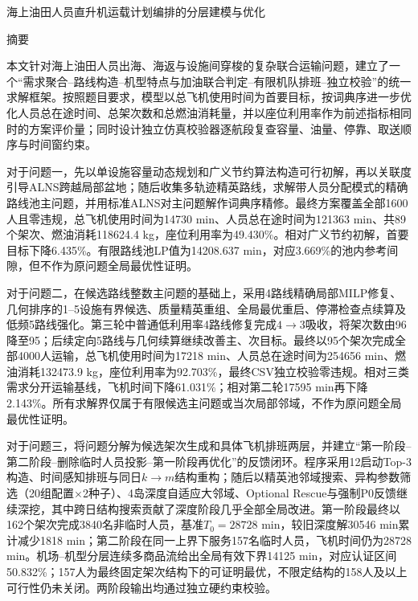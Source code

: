 \documentclass[UTF8,a4paper,zihao=5]{ctexart}
\newcommand{\papertitle}{海上油田人员直升机运载计划编排的分层建模与优化}
\begin{document}
\setcounter{page}{1}

\thispagestyle{plain}
\begin{center}
  {\heiti{}\papertitle\par}
  \vspace{1.2em}
  {\heiti{}摘\quad 要}
\end{center}

本文针对海上油田人员出海、海返与设施间穿梭的复杂联合运输问题，建立了一个“需求聚合--路线构造--机型特点与加油联合判定--有限机队排班--独立校验”的统一求解框架。按照题目要求，模型以总飞机使用时间为首要目标，按词典序进一步优化人员总在途时间、总架次数和总燃油消耗量，并以座位利用率作为前述指标相同时的方案评价量；同时设计独立仿真校验器逐航段复查容量、油量、停靠、取送顺序与时间窗约束。

对于问题一，先以单设施容量动态规划和广义节约算法构造可行初解，再以关联度引导ALNS跨越局部盆地；随后收集多轨迹精英路线，求解带人员分配模式的精确路线池主问题，并用标准ALNS对主问题解作词典序精修。最终方案覆盖全部1600人且零违规，总飞机使用时间为14730 min、人员总在途时间为121363 min、共89个架次、燃油消耗118624.4 kg，座位利用率为49.430\%。相对广义节约初解，首要目标下降6.435\%。有限路线池LP值为14208.637 min，对应3.669\%的池内参考间隙，但不作为原问题全局最优性证明。

对于问题二，在候选路线整数主问题的基础上，采用4路线精确局部MILP修复、几何排序的1--5设施有界候选、质量精英重组、全局最优重启、停滞检查点续算及低频5路线强化。第三轮中普通低利用率4路线修复完成$4\to3$吸收，将架次数由96降至95；后续定向5路线与几何续算继续改善主、次目标。最终以95个架次完成全部4000人运输，总飞机使用时间为17218 min、人员总在途时间为254656 min、燃油消耗132473.9 kg，座位利用率为92.703\%，最终CSV独立校验零违规。相对三类需求分开运输基线，飞机时间下降61.031\%；相对第二轮17595 min再下降2.143\%。所有求解界仅属于有限候选主问题或当次局部邻域，不作为原问题全局最优性证明。

对于问题三，将问题分解为候选架次生成和具体飞机排班两层，并建立“第一阶段--第二阶段--删除临时人员投影--第一阶段再优化”的反馈闭环。程序采用12启动Top-$3$构造、时间感知排班与同日$k\to m$结构重构；随后以精英池邻域搜索、异构参数筛选（20组配置$\times$2种子）、4岛深度自适应大邻域、Optional Rescue与强制P0反馈继续深挖，其中跨日结构搜索贡献了深度阶段几乎全部全局改进。第一阶段最终以162个架次完成3840名非临时人员，基准$T_0=28728$ min，较旧深度解30546 min累计减少1818 min；第二阶段在同一上界下服务157名临时人员，飞机时间仍为28728 min。机场--机型分层连续多商品流给出全局有效下界14125 min，对应认证区间50.832\%；157人为最终固定架次结构下的可证明最优，不限定结构的158人及以上可行性仍未关闭。两阶段输出均通过独立硬约束校验。
\end{document}
